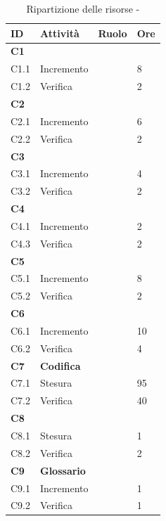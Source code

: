 \documentclass[12pt,a4paper]{article}
\begin{document}
\begin{table}[H]
	\begin{center}
		\begin{tabular}{p{} p{} p{} p{}}
			\toprule
			\textbf{ID}	& \textbf{Attività}	& \textbf{Ruolo} & \textbf{Ore} \\ \midrule
			\midrule
			\textbf{C1} & \textbf{\AdR{}} & &  \\ \midrule
			C1.1 & Incremento & \AN{} & 8 \\ \midrule
			C1.2 & Verifica & \VR{} & 2 \\ \midrule
			\textbf{C2} & \textbf{\NdP{}} &  & \\ \midrule
			C2.1 & Incremento & \AM{} & 6 \\ \midrule
			C2.2 & Verifica & \VR{} & 2 \\ \midrule
			\textbf{C3} & \textbf{\PdP{}} & &  \\ \midrule
			C3.1 & Incremento & \RE{} & 4 \\ \midrule
			C3.2 & Verifica & \VR{} & 2 \\ \midrule
			\textbf{C4} & \textbf{\PdQ{}} & & \\ \midrule
			C4.1 & Incremento & \RE{} \newline \PG & 2 \newline 6 \\ \midrule
			C4.3 & Verifica & \VR{} & 2 \\ \midrule
			\textbf{C5} & \textbf{\ST{}} & & \\ \midrule
			C5.1 & Incremento & \PG{} & 8 \\ \midrule
			C5.2 & Verifica & \VR{} & 2 \\ \midrule
			\textbf{C6} & \textbf{\DP{}} & & \\ \midrule
			C6.1 & Incremento & \PG{} & 10 \\ \midrule
			C6.2 & Verifica & \VR{} & 4 \\ \midrule
			\textbf{C7} & \textbf{Codifica} & & \\ \midrule
			C7.1 & Stesura & \PR{} & 95 \\ \midrule
			C7.2 & Verifica & \VR{} & 40 \\ \midrule
			\textbf{C8} & \textbf{\MU{}} & & \\ \midrule
			C8.1 & Stesura & \AM{} \newline \PG{} & 1 \newline 5 \\ \midrule
			C8.2 & Verifica & \VR{} & 2 \\ \midrule
			\textbf{C9} & \textbf{Glossario} & & \\ \midrule
			C9.1 & Incremento & \VR{} & 1 \\ \midrule
			C9.2 & Verifica & \VR{} & 1 \\
			\bottomrule
		\end{tabular}
		\caption{Ripartizione delle risorse - \FPDC{}}
	\end{center}
\end{table}
\end{document}
